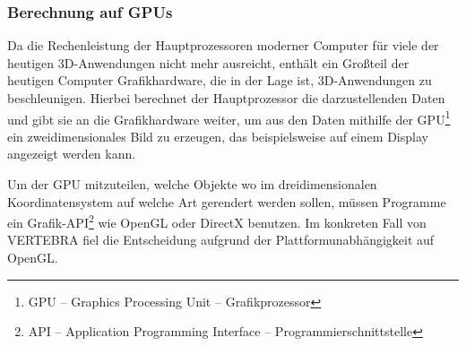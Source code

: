 \documentclass[ngerman,pdftex,paper=A4,DIV=calc,titlepage,12pt]{scrartcl}
\newtheorem[L]{boxedDefinition}{Definition}
\begin{document}
\subsubsection{Berechnung auf GPUs}\label{sssec:gpucalculation}
Da die Rechenleistung der Hauptprozessoren moderner Computer für viele der heutigen 3D-Anwendungen nicht mehr ausreicht, enthält ein Großteil der heutigen Computer Grafikhardware, die in der Lage ist, 3D-Anwendungen zu beschleunigen. Hierbei berechnet der Hauptprozessor die darzustellenden Daten und gibt sie an die Grafikhardware weiter, um aus den Daten mithilfe der GPU\footnote{GPU -- Graphics Processing Unit -- Grafikprozessor} ein zweidimensionales Bild zu erzeugen, das beispielsweise auf einem Display angezeigt werden kann.

Um der GPU mitzuteilen, welche Objekte wo im dreidimensionalen Koordinatensystem auf welche Art gerendert werden sollen, müssen Programme ein Grafik-API\footnote{API -- Application Programming Interface -- Programmierschnittstelle} wie OpenGL oder DirectX benutzen. Im konkreten Fall von VERTEBRA fiel die Entscheidung aufgrund der Plattformunabhängigkeit auf OpenGL.
\end{document}
